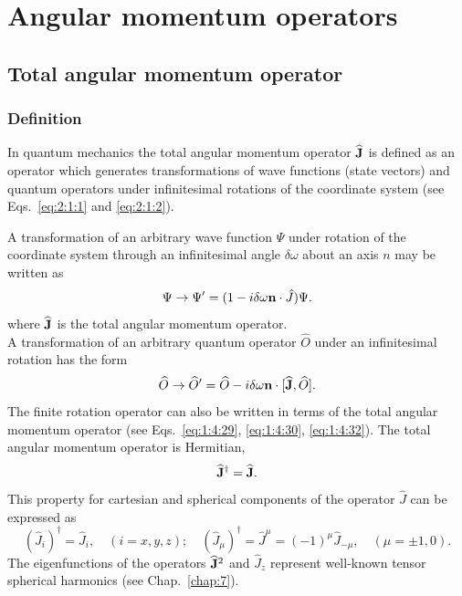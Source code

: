 \chapter{Angular momentum operators} \label{chap:2}
\section{Total angular momentum operator} \label{sec:2.1}
\subsection{Definition}
In quantum mechanics the total angular momentum operator $\widehat{\mathbf{J}}$ is defined as an operator which generates transformations of wave functions (state vectors) and quantum operators under infinitesimal rotations of the coordinate system (see Eqs.~\eqref{eq:2:1:1} and \eqref{eq:2:1:2}).

A transformation of an arbitrary wave function $\Psi$ under rotation of the coordinate system through an infinitesimal angle $\delta \omega$ about an axis $n$ may be written as
\begin{equation}
\Psi \rightarrow \Psi^{\prime}=(1-i \delta \omega \mathbf{n} \cdot \hat{J}) \Psi . \label{eq:2:1:1}
\end{equation}
where $\widehat{\mathbf{J}}$ is the total angular momentum operator.\\
A transformation of an arbitrary quantum operator $\widehat{O}$ under an infinitesimal rotation has the form
\begin{equation}
\widehat{O} \rightarrow \widehat{O}^{\prime}=\widehat{O}-i \delta \omega \mathbf{n} \cdot[\widehat{\mathbf{J}}, \widehat{O}] . \label{eq:2:1:2}
\end{equation}
The finite rotation operator can also be written in terms of the total angular momentum operator (see Eqs.~\ref{eq:1:4:29}, \ref{eq:1:4:30}, \ref{eq:1:4:32}). The total angular momentum operator is Hermitian,
\begin{equation}
\widehat{\mathbf{J}}^{\dagger}=\widehat{\mathbf{J}} . \label{eq:2:1:3}
\end{equation}
This property for cartesian and spherical components of the operator $\widehat{J}$ can be expressed as
\begin{equation}
\left(\widehat{J}_{i}\right)^{\dagger}=\widehat{J}_{i}, \quad(i=x, y, z) ; \quad\left(\widehat{J}_{\mu}\right)^{\dagger}=\widehat{J}^{\mu}=(-1)^{\mu} \widehat{J}_{-\mu}, \quad(\mu= \pm 1,0). \label{eq:2:1:4}
\end{equation}
The eigenfunctions of the operators $\widehat{\mathbf{J}}^{2}$ and $\widehat{J}_{z}$ represent well-known tensor spherical harmonics (see Chap.~\ref{chap:7}).

